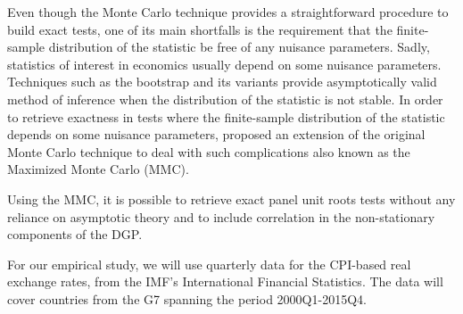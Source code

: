 \documentclass[12pt]{article}\usepackage[]{graphicx}\usepackage[]{color}
\begin{document}
Even though the Monte Carlo technique provides a straightforward procedure to build exact tests, one of its main shortfalls is the requirement that the finite-sample distribution of the statistic be free of any nuisance parameters. Sadly, statistics of interest in economics usually depend on some nuisance parameters. Techniques such as the bootstrap and its variants provide asymptotically valid method of inference when the distribution of the statistic is not stable. In order to retrieve exactness in tests where the finite-sample distribution of the statistic depends on some nuisance parameters, \cite{dufour_monte_2006} proposed an extension of the original Monte Carlo technique to deal with such complications also known as the Maximized Monte Carlo (MMC).

Using the MMC, it is possible to retrieve exact panel unit roots tests without any reliance on asymptotic theory and to include correlation in the non-stationary components of the DGP.

For our empirical study, we will use quarterly data for the CPI-based real exchange rates, from the IMF's International Financial Statistics. The data will cover countries from the G7 spanning the period 2000Q1-2015Q4.


%
%
%
%
%
%
%
%
%
%




\clearpage
\singlespacing


\end{document}
